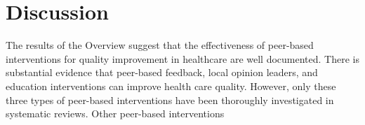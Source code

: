 \documentclass[12pt]{article}
\begin{document}
\section{Discussion}

The results of the Overview suggest that the effectiveness of peer-based interventions for quality improvement in healthcare are well documented. There is substantial evidence that peer-based feedback, local opinion leaders, and education interventions can improve health care quality. However, only these three types of peer-based interventions have been thoroughly investigated in systematic reviews. Other peer-based interventions






\clearpage


\end{document}
